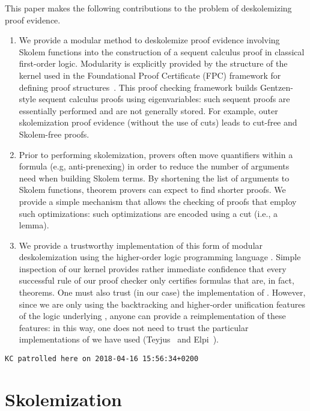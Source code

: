 \documentclass[a4paper,USenglish]{lipics-v2018}
\begin{document}
This paper makes the following contributions to the problem of
deskolemizing proof evidence.
%
\begin{enumerate}
\item We provide a modular method to deskolemize proof evidence
  involving Skolem functions into the construction of a sequent calculus
  proof in classical first-order logic.
  Modularity is explicitly provided by the structure of the kernel used
  in the Foundational Proof Certificate (FPC) framework for defining
  proof structures~\cite{chihani17jar}.
  This proof checking framework builds Gentzen-style \LK sequent calculus
  proofs using eigenvariables: such sequent proofs are essentially
  performed and are not generally stored.
  For example, outer skolemization proof evidence (without the use of
  cuts) leads to cut-free and Skolem-free \LK proofs.

\item Prior to performing skolemization, provers often move quantifiers
  within a formula (e.g, anti-prenexing) in order to reduce the number
  of arguments need when building Skolem terms.
  By shortening the list of arguments to Skolem functions, theorem
  provers can expect to find shorter proofs.
  We provide a simple mechanism that allows the checking of proofs that
  employ such optimizations: such optimizations are encoded using a cut
  (i.e., a lemma).

\item We provide a trustworthy implementation of this form of modular
  deskolemization using the higher-order logic programming language
  \lP.
  Simple inspection of our kernel provides rather immediate confidence
  that every successful rule of our proof checker only certifies
  formulas that are, in fact, theorems.
  One must also trust (in our case) the implementation of \lP.
  However, since we are only using the backtracking and higher-order
  unification features of the logic underlying \lP, anyone can provide a
  reimplementation of these features: in this way, one does not need to
  trust the particular implementations of \lP we have used
  (Teyjus~\cite{nadathur99cade} and Elpi~\cite{dunchev15lpar}).
\end{enumerate}

\noindent%
\texttt{\color{red}KC patrolled here on 2018-04-16 15:56:34+0200}

\section{Skolemization}
\label{sec:skolemization}
\end{document}
